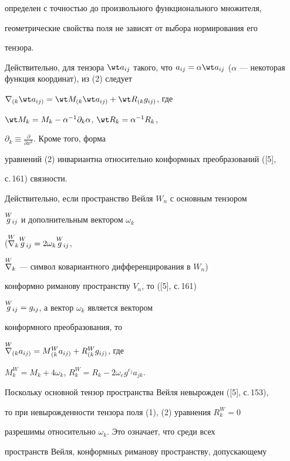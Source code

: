 определен с точностью до произвольного функционального множителя, 


геометрические свойства поля не зависят от выбора нормирования его 


тензора. 


 


Действительно, для тензора $\wt a_{ij}$ такого, что $a_{ij}=\alpha\wt 


a_{ij}$ ($\alpha$ --- некоторая функция координат), из (2) следует 


$\nabla_{(k}\wt a_{ij)}=\wt M_{(k}\wt a_{ij)}+\wt R_{(k}g_{ij)}$, где 


$\wt M_k=M_k-\alpha^{-1}\partial_k\alpha$, $\wt R_k=\alpha^{-1}R_k$, 


$\partial_k\equiv\frac{\partial}{\partial x^k}$. Кроме того, форма 


уравнений (2) инвариантна относительно конформных преобразований ([5], 


с.\,161) связности. 


 


Действительно, если пространство Вейля $W_n$ с основным тензором 


$\overset{W}{g}{}_{ij}$ и дополнительным вектором $\omega_k$ 


($\overset{W}{\nabla}{}_k\overset{W}{g}{}_{ij}=2\omega_k \overset{W}{g}{}_{ij}$, 


$\overset{W}{\nabla}{}_k$ --- символ ковариантного дифференцирования в $W_n$) 


конформно риманову пространству $V_n$, то ([5], с.\,161) 


$\overset{W}{g}{}_{ij}=g_{ij}$, а вектор $\omega_k$ является вектором 


конформного преобразования, то


$\overset{W}{\nabla}{}_{(k}a_{ij)}=M{}^W_{(k}a_{ij)}+R{}^W_{(k}g_{ij)}$, где 


$M^W_k=M_k+4\omega_k$, $R^W_k=R_k-2\omega_e g^{e_j}a_{jk}$. 


 


Поскольку основной тензор пространства Вейля невырожден ([5], с.\,153), 


то при невырожденности тензора поля (1), (2) уравнения $R^W_k=0$ 


разрешимы относительно $\omega_k$. Это означает, что среди всех 


пространств Вейля, конформных риманову пространству, допускающему 


